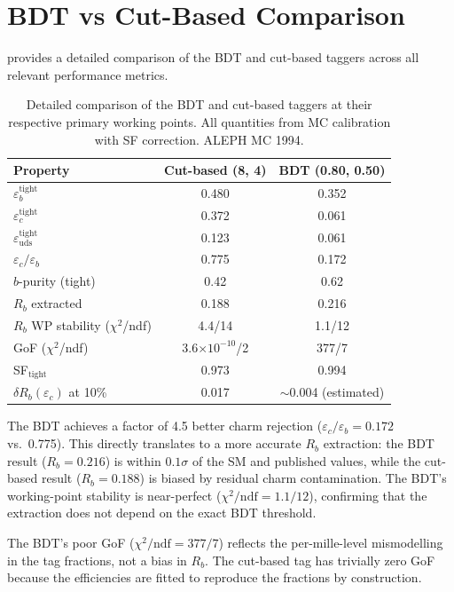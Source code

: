 \documentclass[11pt,a4paper]{article}
\begin{document}
\section{BDT vs Cut-Based Comparison}
\label{app:bdt-comparison}

 provides a detailed comparison of the BDT and
cut-based taggers across all relevant performance metrics.

\begin{table}[htbp]
\centering
\caption{Detailed comparison of the BDT and cut-based taggers at their
  respective primary working points.  All quantities from MC calibration
  with SF correction.  ALEPH MC 1994.}
\label{tbl:bdt-vs-cut}
\begin{tabular}{lcc}
\toprule
Property & Cut-based (8, 4) & BDT (0.80, 0.50) \\
\midrule
$\varepsilon_b^\mathrm{tight}$ & 0.480 & 0.352 \\
$\varepsilon_c^\mathrm{tight}$ & 0.372 & 0.061 \\
$\varepsilon_\mathrm{uds}^\mathrm{tight}$ & 0.123 & 0.061 \\
$\varepsilon_c / \varepsilon_b$ & 0.775 & 0.172 \\
$b$-purity (tight) & 0.42 & 0.62 \\
$R_b$ extracted & 0.188 & 0.216 \\
$R_b$ WP stability ($\chi^2$/ndf) & 4.4/14 & 1.1/12 \\
GoF ($\chi^2$/ndf) & 3.6$\times 10^{-10}$/2 & 377/7 \\
SF$_\mathrm{tight}$ & 0.973 & 0.994 \\
$\delta R_b(\varepsilon_c)$ at 10\% & 0.017 & $\sim$0.004 (estimated) \\
\bottomrule
\end{tabular}
\end{table}

The BDT achieves a factor of 4.5 better charm rejection
($\varepsilon_c/\varepsilon_b = 0.172$ vs.\ 0.775).  This directly
translates to a more accurate $R_b$ extraction: the BDT result
($R_b = 0.216$) is within $0.1\sigma$ of the SM and published values,
while the cut-based result ($R_b = 0.188$) is biased by residual charm
contamination.  The BDT's working-point stability is near-perfect
($\chi^2/\mathrm{ndf} = 1.1/12$), confirming that the extraction does
not depend on the exact BDT threshold.

The BDT's poor GoF ($\chi^2/\mathrm{ndf} = 377/7$) reflects the
per-mille-level mismodelling in the tag fractions, not a bias in $R_b$.
The cut-based tag has trivially zero GoF because the efficiencies are
fitted to reproduce the fractions by construction.
\end{document}
